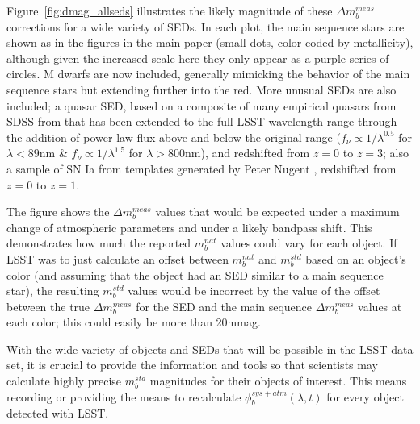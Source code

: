 \documentclass[12pt,preprint]{aastex}
\begin{document}
Figure~\ref{fig:dmag_allseds} illustrates the likely magnitude of
these $\Delta m_b^{meas}$ corrections for a wide variety of SEDs. In
each plot, the main sequence stars are shown as in the figures in the
main paper (small dots, color-coded by metallicity), although given
the increased scale here they only appear as a purple series of
circles. M dwarfs are now included, generally mimicking the behavior
of the main sequence stars but extending further into the red. More
unusual SEDs are also included; a quasar SED, based on a composite of
many empirical quasars from SDSS from \citet{VandenBerk2001} that has
been extended to the full LSST wavelength range through the addition
of power law flux above and below the original range ($f_\nu \propto
1/\lambda^{0.5}$ for $\lambda<89$nm \& $f_\nu \propto 1/\lambda^{1.5}$
for $\lambda>800$nm), and redshifted from $z=0$ to $z=3$; also a
sample of SN Ia from templates generated by Peter Nugent
\citep{Nugent2002}, redshifted from $z=0$ to $z=1$.

The figure shows the $\Delta m_b^{meas}$ values that would be expected
under a maximum change of atmospheric parameters and under a likely
bandpass shift. This demonstrates how much the reported $m_b^{nat}$
values could vary for each object. If LSST was to just calculate an
offset between $m_b^{nat}$ and $m_b^{std}$ based on an object's color
(and assuming that the object had an SED similar to a main sequence
star), the resulting $m_b^{std}$ values would be incorrect by the
value of the offset between the true $\Delta m_b^{meas}$ for the SED
and the main sequence $\Delta m_b^{meas}$ values at each color; this
could easily be more than 20mmag.  

With the wide variety of objects and SEDs that will be possible in the
LSST data set, it is crucial to provide the information and tools so that
scientists may calculate highly precise $m_b^{std}$ magnitudes for
their objects of interest. This means recording or providing the means
to recalculate $\phi_b^{sys+atm}(\lambda,t)$ for every object detected
with LSST. 
\end{document}
